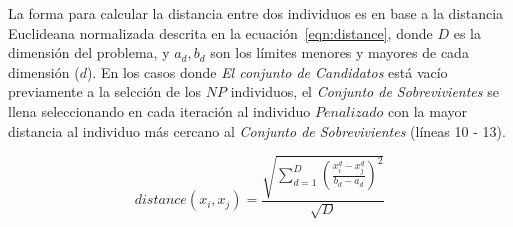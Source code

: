La forma para calcular la distancia entre dos individuos es en base a la distancia Euclideana normalizada descrita en la ecuación~\ref{eqn:distance}, donde $D$ es la dimensión del problema, y $a_d, b_d$ son los límites menores y mayores de cada dimensión ($d$).
%
%
En los casos donde \textit{El conjunto de Candidatos} está vacío previamente a la selcción de los $NP$ individuos, el \textit{Conjunto de Sobrevivientes} se llena seleccionando en cada iteración al individuo $Penalizado$ con la mayor distancia al individuo más cercano al \textit{Conjunto de Sobrevivientes} (líneas 10 - 13).

\begin{equation}\label{eqn:distance}
distance ( x_{i}, x_j ) = \frac{\sqrt{ \sum_{d=1}^D \left ( \frac{x_{i}^d - x_j^d}{b_d - a_d} \right )^2  }} {\sqrt{D}}
\end{equation}


